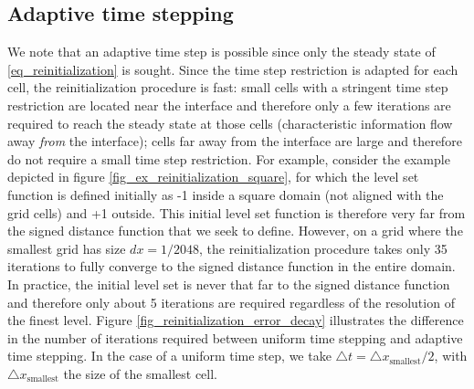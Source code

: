 \documentclass[english]{article}
\begin{document}
\subsection{Adaptive time stepping}
We note that an adaptive time step is possible since only the steady state
of \eqref{eq_reinitialization} is sought. Since the time step restriction
is adapted for each cell, the reinitialization procedure is fast: small
cells with a stringent time step restriction are located near the interface
and therefore only a few iterations are required to reach the steady state
at those cells (characteristic information flow away \textit{from} the
interface); cells far away from the interface are large and therefore do
not require a small time step restriction. For example, consider the
example depicted in figure \ref{fig_ex_reinitialization_square}, for which
the level set function is defined initially as -1 inside a square domain
(not aligned with the grid cells) and +1 outside. This initial level set
function is therefore very far from the signed distance function that we
seek to define. However, on a grid where the smallest grid has size
$dx=1/2048$, the reinitialization procedure takes only 35 iterations to
fully converge to the signed distance function in the entire domain. In
practice, the initial level set is never that far to the signed distance
function and therefore only about 5 iterations are required regardless of
the resolution of the finest level. Figure
\ref{fig_reinitialization_error_decay} illustrates the difference in the
number of iterations required between uniform time stepping and adaptive
time stepping. In the case of a uniform time step, we take $\triangle
t=\triangle x_{\text{smallest}}/2$, with $\triangle x_{\text{smallest}}$
the size of the smallest cell.
\end{document}
